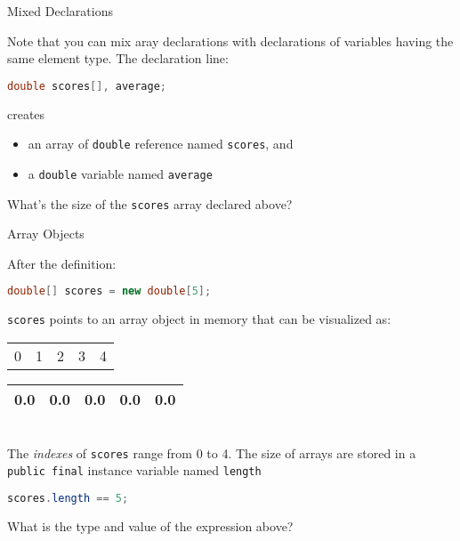 \documentclass{beamer}
\begin{document}
\begin{frame}[fragile]{Mixed Declarations}


Note that you can mix aray declarations with declarations of variables having the same element type.  The declaration line:
\begin{lstlisting}[language=Java]
double scores[], average;
\end{lstlisting}
creates
\begin{itemize}
\item an array of {\tt double} reference named {\tt scores}, and
\item a {\tt double} variable named {\tt average}
\end{itemize}

What's the size of the {\tt scores} array declared above?

\end{frame}

\begin{frame}[fragile]{Array Objects}


After the definition:
\begin{lstlisting}[language=Java]
double[] scores = new double[5];
\end{lstlisting}
{\tt scores} points to an array object in memory that can be visualized as:\\
\vspace{.1in}
\begin{tabular}{p{.5in}p{.5in}p{.5in}p{.5in}p{.5in}}
0 & 1 & 2 & 3 & 4 \\
\end{tabular}
\begin{tabular}{|p{.5in}|p{.5in}|p{.5in}|p{.5in}|p{.5in}|}\hline
0.0 & 0.0 & 0.0 & 0.0 & 0.0 \\
\hline
\end{tabular}\\
\vspace{.1in}
The {\it indexes} of {\tt scores} range from 0 to 4.  The size of arrays are stored in a {\tt public final} instance variable named {\tt length}

\begin{lstlisting}[language=Java]
scores.length == 5;
\end{lstlisting}
What is the type and value of the expression above?

\end{frame}
\end{document}
